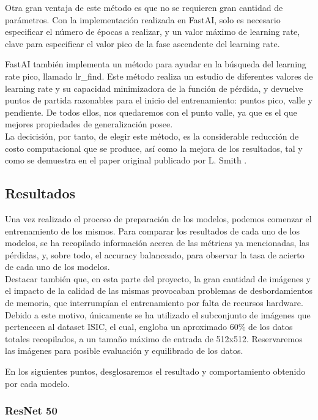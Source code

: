 Otra gran ventaja de este método es que no se requieren gran cantidad de parámetros. Con la implementación realizada en FastAI, solo es necesario especificar el número de épocas a realizar, y un valor máximo de learning rate, clave para especificar el valor pico de la fase ascendente del learning rate.

FastAI también implementa un método para ayudar en la búsqueda del learning rate pico, llamado lr\_find. Este método realiza un estudio de diferentes valores de learning rate y su capacidad minimizadora de la función de pérdida, y devuelve puntos de partida razonables para el inicio del entrenamiento: puntos pico, valle y pendiente. De todos ellos, nos quedaremos con el punto valle, ya que es el que mejores propiedades de generalización posee.\\

La decicisión, por tanto, de elegir este método, es la considerable reducción de costo computacional que se produce, así como la mejora de los resultados, tal y como se demuestra en el paper original publicado por L. Smith \cite{smith2018disciplined}. 

\subsection{Resultados}

Una vez realizado el proceso de preparación de los modelos, podemos comenzar el entrenamiento de los mismos. Para comparar los resultados de cada uno de los modelos, se ha recopilado información acerca de las métricas ya mencionadas, las pérdidas, y, sobre todo, el accuracy balanceado, para observar la tasa de acierto de cada uno de los modelos.\\

Destacar también que, en esta parte del proyecto, la gran cantidad de imágenes y el impacto de la calidad de las mismas provocaban problemas de desbordamientos de memoria, que interrumpían el entrenamiento por falta de recursos hardware. Debido a este motivo, únicamente se ha utilizado el subconjunto de imágenes que pertenecen al dataset ISIC, el cual, engloba un aproximado 60\% de los datos totales recopilados, a un tamaño máximo de entrada de 512x512. Reservaremos las imágenes para posible evaluación y equilibrado de los datos.

En los siguientes puntos, desglosaremos el resultado y comportamiento obtenido por cada modelo.

\subsubsection{ResNet 50}

